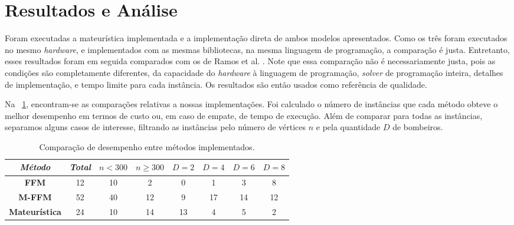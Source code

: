 \documentclass{MO824}
\begin{document}
        \begin{table}[ht]
            \centering
            \vspace{0.3cm}
            \caption{Condições de Execução}
            \label{tab:conditions}
        \end{table}

\section{Resultados e Análise}

Foram executadas a mateurística implementada e a implementação direta de ambos modelos apresentados. Como os três foram executados no mesmo \textit{hardware}, e implementados com as mesmas bibliotecas, na mesma linguagem de programação, a comparação é justa. Entretanto, esses resultados foram em seguida comparados com os de Ramos et al. \cite{ffp-instances-page}. Note que essa comparação não é necessariamente justa, pois as condições são completamente diferentes, da capacidade do \textit{hardware} à linguagem de programação, \textit{solver} de programação inteira, detalhes de implementação, e tempo limite para cada instância. Os resultados são então usados como referência de qualidade.

Na \tablename~\ref{tab:comp-our}, encontram-se as comparações relativas a nossas implementações. Foi calculado o número de instâncias que cada método obteve o melhor desempenho em termos de custo ou, em caso de empate, de tempo de execução. Além de comparar para todas as instâncias, separamos alguns casos de interesse, filtrando as instâncias pelo número de vértices $n$ e pela quantidade $D$ de bombeiros.

\begin{table}[ht]
    \centering
    \begin{tabular}{|c|c|c|c|c|c|c|c|}
        \hline
         \textit{Método} & \textit{Total} & $n < 300$ & $n \geq 300$ & $D = 2$ & $D = 4$ & $D = 6$ & $D = 8$ \\
         \hline
         \textbf{FFM} & 12 & 10 & 2 & 0 & 1 & 3 & 8 \\
         \textbf{M-FFM} & 52 & 40 & 12 & 9 & 17 & 14 & 12 \\
         \textbf{Mateurística} & 24 & 10 & 14 & 13 & 4 & 5 & 2 \\
         \hline
    \end{tabular}
    \caption{Comparação de desempenho entre métodos implementados.}
    \label{tab:comp-our}
\end{table}
\end{document}

